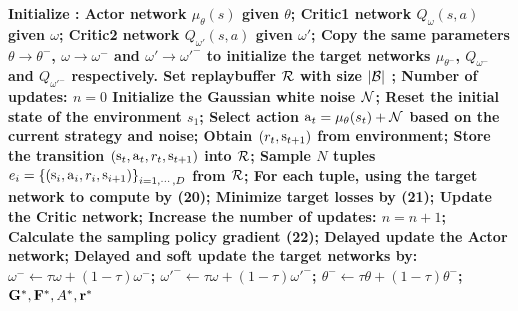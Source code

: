 \documentclass[conference]{IEEEtran}
\begin{document}
           \begin{algorithm}
           \caption{Joint Optimization based on TD3}
           \label{Algorithm 1}
           \begin{algorithmic}[1]
              \STATE \bf{Initialize} :
              \STATE  Actor network ${\mu _\theta }(s)$ given $\theta $;
              \STATE  Critic1 network ${Q_\omega }(s,a)$ given $\omega $;
              \STATE  Critic2 network ${Q_{\omega '}}(s,a)$ given $\omega' $;
              \STATE  Copy the same parameters $\theta  \to {\theta ^ - }$, $\omega  \to {\omega ^ - }$ and ${\omega '} \to {{\omega'} ^ - }$ to initialize the target networks ${\mu _{{\theta ^ - }}}$, ${Q_{{\omega ^ - }}}$ and ${Q_{{\omega '}^-}}$ respectively.
              \STATE  Set replaybuffer $\cal{R}$   with size $\left| {\cal B} \right|$ ;
              \STATE  Number of updates: $n = 0$
              \STATE Initialize the Gaussian white noise ${\cal N}$;
              \STATE  Reset the initial state of the environment ${s_1}$;
              \STATE Select action ${{\mathop{\rm a}\nolimits} _t} = {\mu _\theta }({s_t}) + {\cal N}$  based on the current strategy and noise;
              \STATE Obtain $({r_t},{{\mathop{\rm s}\nolimits} _{t + 1}})$ from environment;
              \STATE Store the transition $({{\mathop{\rm s}\nolimits} _t},{{\mathop{\rm a}\nolimits} _t},{r_t},{{\mathop{\rm s}\nolimits} _{t + 1}})$ into $\cal{R}$;
                \STATE Sample $N$ tuples ${e_i} = {\left\{ {({{\mathop{\rm s}\nolimits} _i},{{\mathop{\rm a}\nolimits} _i},{r_i},{{\mathop{\rm s}\nolimits} _{i + 1}})} \right\}_{i = 1, \cdots ,D}}$ from ${\cal R}$;
                \STATE For each tuple, using the target network to compute by (20);
                \STATE Minimize target losses by (21);
                \STATE Update the Critic network;
                \STATE Increase the number of updates: $n = n + 1$;
                    \STATE Calculate the sampling policy gradient (22);
                    \STATE Delayed update the Actor network;
                    \STATE Delayed and soft update the target networks by:
                    \STATE ${\omega ^ - } \leftarrow \tau \omega  + (1 - \tau ){\omega ^ - }$;                     \STATE ${{\omega'} ^ - } \leftarrow \tau \omega  + (1 - \tau ){{\omega'} ^ - }$;
                    \STATE ${\theta ^ - } \leftarrow \tau \theta  + (1 - \tau ){\theta ^ - }$;
                  \ENDIF
        \ENDWHILE
    \ENDFOR
\ENDFOR
\RETURN ${{\bf{G}}^*},{{\bf{F}}^*},{A^*},{{\bf{r}}^*}$
\end{algorithmic}
\end{algorithm}
\end{document}
